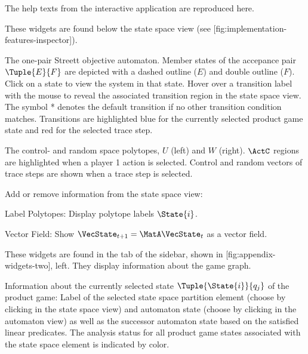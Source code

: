 The help texts from the interactive application are reproduced here.


\startsubject[title=View Widgets]

    These widgets are found below the state space view (see [fig:implementation-features-inspector]).

    \startsubsubject[title={Widget: Objective Automaton}]

        The one-pair Streett objective automaton.
        Member states of the accepance pair $\Tuple{E}{F}$ are depicted with a dashed outline ($E$) and double outline ($F$).
        Click on a state to view the system in that state.
        Hover over a transition label with the mouse to reveal the associated transition region in the state space view.
        The symbol * denotes the default transition if no other transition condition matches.
        Transitions are highlighted blue for the currently selected product game state and red for the selected trace step.

    \stopsubsubject

    \startsubsubject[title={Widget: Control and Random Space}]

        The control- and random space polytopes, $U$ (left) and $W$ (right).
        $\ActC$ regions are highlighted when a player 1 action is selected.
        Control and random vectors of trace steps are shown when a trace step is selected.

    \stopsubsubject

    \startsubsubject[title={Widget: View Settings}]

        Add or remove information from the state space view:

        \startitemize[packed]
            \item{Label Polytopes: Display polytope labels $\State{i}$.}
            \item{Vector Field: Show $\VecState_{t+1} = \MatA \VecState_{t}$ as a vector field.}
        \stopitemize

    \stopsubsubject

\stopsubject


\startsubject[title={State Widgets}]

    These widgets are found in the  tab of the sidebar, shown in [fig:appendix-widgets-two], left.
    They display information about the game graph.

    \startsubsubject[title={Widget: Selection}]
        Information about the currently selected state $\Tuple{\State{i}}{q_j}$ of the product game:
        Label of the selected state space partition element (choose by clicking in the state space view) and automaton state (choose by clicking in the automaton view) as well as the successor automaton state based on the satisfied linear predicates.
        The analysis status for all product game states associated with the state space element is indicated by color.

